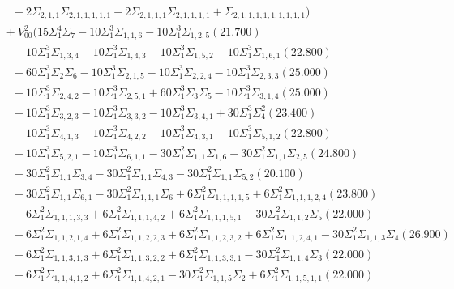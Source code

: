 \documentclass[12pt]{article}
\begin{document}
\begin{landscape}
\begin{align*}
		&\quad\quad -2\Sigma_{2,1,1}\Sigma_{2,1,1,1,1,1}-2\Sigma_{2,1,1,1}\Sigma_{2,1,1,1,1}+\Sigma_{2,1,1,1,1,1,1,1,1,1}) \\
		&\quad\; +V_{00}^{2}(15\Sigma_{1}^{4}\Sigma_{7}-10\Sigma_{1}^{3}\Sigma_{1,1,6}-10\Sigma_{1}^{3}\Sigma_{1,2,5}(21.700) \\ 
		&\quad\quad -10\Sigma_{1}^{3}\Sigma_{1,3,4}-10\Sigma_{1}^{3}\Sigma_{1,4,3}-10\Sigma_{1}^{3}\Sigma_{1,5,2}-10\Sigma_{1}^{3}\Sigma_{1,6,1}(22.800) \\ 
		&\quad\quad +60\Sigma_{1}^{3}\Sigma_{2}\Sigma_{6}-10\Sigma_{1}^{3}\Sigma_{2,1,5}-10\Sigma_{1}^{3}\Sigma_{2,2,4}-10\Sigma_{1}^{3}\Sigma_{2,3,3}(25.000) \\ 
		&\quad\quad -10\Sigma_{1}^{3}\Sigma_{2,4,2}-10\Sigma_{1}^{3}\Sigma_{2,5,1}+60\Sigma_{1}^{3}\Sigma_{3}\Sigma_{5}-10\Sigma_{1}^{3}\Sigma_{3,1,4}(25.000) \\ 
		&\quad\quad -10\Sigma_{1}^{3}\Sigma_{3,2,3}-10\Sigma_{1}^{3}\Sigma_{3,3,2}-10\Sigma_{1}^{3}\Sigma_{3,4,1}+30\Sigma_{1}^{3}\Sigma_{4}^{2}(23.400) \\ 
		&\quad\quad -10\Sigma_{1}^{3}\Sigma_{4,1,3}-10\Sigma_{1}^{3}\Sigma_{4,2,2}-10\Sigma_{1}^{3}\Sigma_{4,3,1}-10\Sigma_{1}^{3}\Sigma_{5,1,2}(22.800) \\ 
		&\quad\quad -10\Sigma_{1}^{3}\Sigma_{5,2,1}-10\Sigma_{1}^{3}\Sigma_{6,1,1}-30\Sigma_{1}^{2}\Sigma_{1,1}\Sigma_{1,6}-30\Sigma_{1}^{2}\Sigma_{1,1}\Sigma_{2,5}(24.800) \\ 
		&\quad\quad -30\Sigma_{1}^{2}\Sigma_{1,1}\Sigma_{3,4}-30\Sigma_{1}^{2}\Sigma_{1,1}\Sigma_{4,3}-30\Sigma_{1}^{2}\Sigma_{1,1}\Sigma_{5,2}(20.100) \\ 
		&\quad\quad -30\Sigma_{1}^{2}\Sigma_{1,1}\Sigma_{6,1}-30\Sigma_{1}^{2}\Sigma_{1,1,1}\Sigma_{6}+6\Sigma_{1}^{2}\Sigma_{1,1,1,1,5}+6\Sigma_{1}^{2}\Sigma_{1,1,1,2,4}(23.800) \\ 
		&\quad\quad +6\Sigma_{1}^{2}\Sigma_{1,1,1,3,3}+6\Sigma_{1}^{2}\Sigma_{1,1,1,4,2}+6\Sigma_{1}^{2}\Sigma_{1,1,1,5,1}-30\Sigma_{1}^{2}\Sigma_{1,1,2}\Sigma_{5}(22.000) \\ 
		&\quad\quad +6\Sigma_{1}^{2}\Sigma_{1,1,2,1,4}+6\Sigma_{1}^{2}\Sigma_{1,1,2,2,3}+6\Sigma_{1}^{2}\Sigma_{1,1,2,3,2}+6\Sigma_{1}^{2}\Sigma_{1,1,2,4,1}-30\Sigma_{1}^{2}\Sigma_{1,1,3}\Sigma_{4}(26.900) \\ 
		&\quad\quad +6\Sigma_{1}^{2}\Sigma_{1,1,3,1,3}+6\Sigma_{1}^{2}\Sigma_{1,1,3,2,2}+6\Sigma_{1}^{2}\Sigma_{1,1,3,3,1}-30\Sigma_{1}^{2}\Sigma_{1,1,4}\Sigma_{3}(22.000) \\ 
		&\quad\quad +6\Sigma_{1}^{2}\Sigma_{1,1,4,1,2}+6\Sigma_{1}^{2}\Sigma_{1,1,4,2,1}-30\Sigma_{1}^{2}\Sigma_{1,1,5}\Sigma_{2}+6\Sigma_{1}^{2}\Sigma_{1,1,5,1,1}(22.000) \\ 

\end{align*}
\end{landscape}
\end{document}
